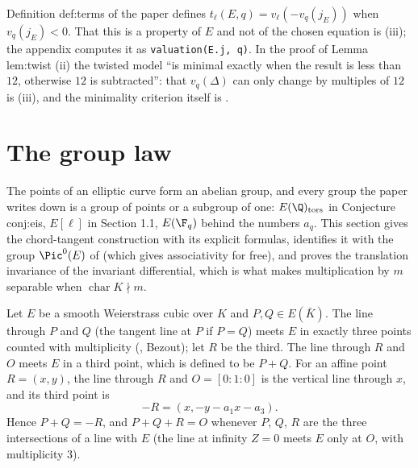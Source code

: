 \begin{paperlink}\label{pl:ellcurves:terms}
Definition def:terms of the paper defines $t_\ell(E,q)=v_\ell(-v_q(j_E))$ when $v_q(j_E)<0$. That this is a property of $E$ and not of the
chosen equation is (iii); the appendix computes it as \texttt{valuation(E.j, q)}. In the proof of Lemma
lem:twist (ii) the twisted model ``is minimal exactly when the result is less than $12$, otherwise $12$ is subtracted'': that $v_q(\Delta)$ can
only change by multiples of $12$ is (iii), and the minimality criterion itself is .
\end{paperlink}

\section{The group law}\label{sec:ellcurves:grouplaw}

The points of an elliptic curve form an abelian group, and every group the paper writes down is a group of points or a subgroup of one:
$E(\Q)_{\mathrm{tors}}$ in Conjecture conj:eis, $E[\ell]$ in Section 1.1, $E(\F_q)$ behind the numbers $a_q$. This section gives the
chord-tangent construction with its explicit formulas, identifies it with the group $\Pic^0(E)$ of  (which gives
associativity for free), and proves the translation invariance of the invariant differential, which is what makes multiplication by $m$
separable when $\operatorname{char}K\nmid m$.

\begin{construction}\label{con:ellcurves:chordtangent}
Let $E$ be a smooth Weierstrass cubic over $K$ and $P,Q\in E(\bar K)$. The line through $P$ and $Q$ (the tangent line at $P$ if $P=Q$) meets
$E$ in exactly three points counted with multiplicity (, Bezout); let $R$ be the third. The line through $R$ and $O$ meets $E$ in a
third point, which is defined to be $P+Q$. For an affine point $R=(x,y)$, the line through $R$ and $O=[0:1:0]$ is the vertical line through $x$,
and its third point is
\[
-R=(x,-y-a_1x-a_3).
\]
Hence $P+Q=-R$, and $P+Q+R=O$ whenever $P$, $Q$, $R$ are the three intersections of a line with $E$ (the line at infinity $Z=0$ meets $E$ only at
$O$, with multiplicity $3$).
\end{construction}

